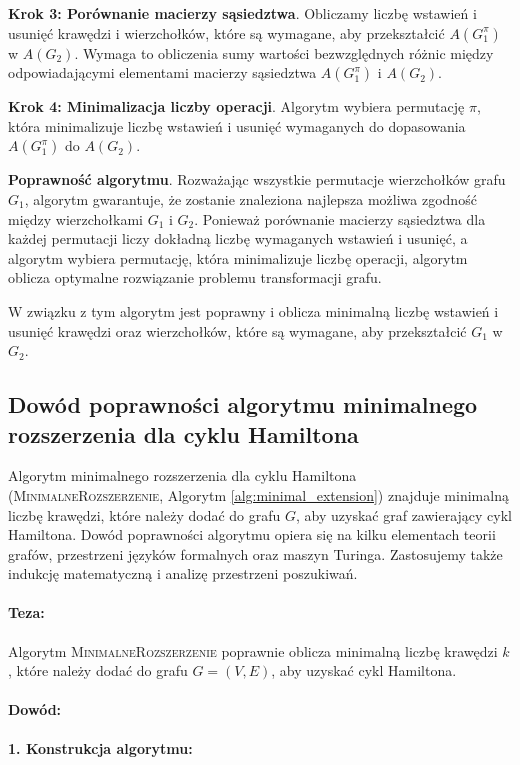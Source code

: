 \textbf{Krok 3: Porównanie macierzy sąsiedztwa}.
Obliczamy liczbę wstawień i usunięć krawędzi i wierzchołków, które są wymagane, aby przekształcić \( A(G_1^\pi) \) w \( A(G_2) \). Wymaga to obliczenia sumy wartości bezwzględnych różnic między odpowiadającymi elementami macierzy sąsiedztwa \( A(G_1^\pi) \) i \( A(G_2) \).

\textbf{Krok 4: Minimalizacja liczby operacji}.
Algorytm wybiera permutację \( \pi \), która minimalizuje liczbę wstawień i usunięć wymaganych do dopasowania \( A(G_1^\pi) \) do \( A(G_2) \).

\textbf{Poprawność algorytmu}.
Rozważając wszystkie permutacje wierzchołków grafu \( G_1 \), algorytm gwarantuje, że zostanie znaleziona najlepsza możliwa zgodność między wierzchołkami \( G_1 \) i \( G_2 \). Ponieważ porównanie macierzy sąsiedztwa dla każdej permutacji liczy dokładną liczbę wymaganych wstawień i usunięć, a algorytm wybiera permutację, która minimalizuje liczbę operacji, algorytm oblicza optymalne rozwiązanie problemu transformacji grafu.

W związku z tym algorytm jest poprawny i oblicza minimalną liczbę wstawień i usunięć krawędzi oraz wierzchołków, które są wymagane, aby przekształcić \( G_1 \) w \( G_2 \).


\subsection{Dowód poprawności algorytmu minimalnego rozszerzenia dla cyklu Hamiltona}

Algorytm minimalnego rozszerzenia dla cyklu Hamiltona (\textsc{MinimalneRozszerzenie}, Algorytm \ref{alg:minimal_extension}) znajduje minimalną liczbę krawędzi, które należy dodać do grafu \( G \), aby uzyskać graf zawierający cykl Hamiltona. Dowód poprawności algorytmu opiera się na kilku elementach teorii grafów, przestrzeni języków formalnych oraz maszyn Turinga. Zastosujemy także indukcję matematyczną i analizę przestrzeni poszukiwań.

\paragraph{Teza:}
Algorytm \textsc{MinimalneRozszerzenie} poprawnie oblicza minimalną liczbę krawędzi \( k \), które należy dodać do grafu \( G = (V, E) \), aby uzyskać cykl Hamiltona.

\paragraph{Dowód:}
\textbf{1. Konstrukcja algorytmu:}

